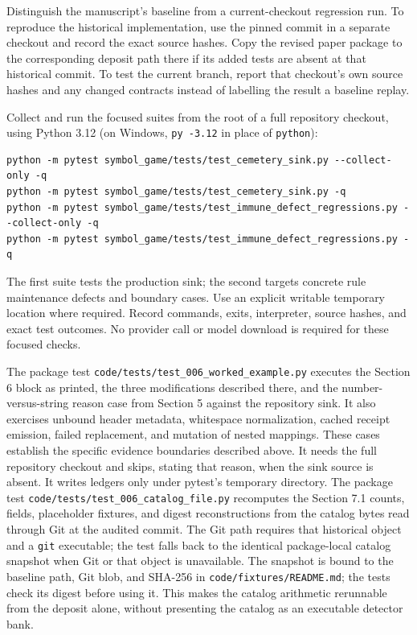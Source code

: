 \documentclass[
  11pt,
]{article}
\newcommand{\passthrough}[1]{#1}
\begin{document}
Distinguish the manuscript's baseline from a current-checkout regression
run. To reproduce the historical implementation, use the pinned commit
in a separate checkout and record the exact source hashes. Copy the
revised paper package to the corresponding deposit path there if its
added tests are absent at that historical commit. To test the current
branch, report that checkout's own source hashes and any changed
contracts instead of labelling the result a baseline replay.

Collect and run the focused suites from the root of a full repository
checkout, using Python 3.12 (on Windows,
\texttt{py -3.12} in place of
\passthrough{\lstinline!python!}):

\begin{lstlisting}
python -m pytest symbol_game/tests/test_cemetery_sink.py --collect-only -q
python -m pytest symbol_game/tests/test_cemetery_sink.py -q
python -m pytest symbol_game/tests/test_immune_defect_regressions.py --collect-only -q
python -m pytest symbol_game/tests/test_immune_defect_regressions.py -q
\end{lstlisting}

The first suite tests the production sink; the second targets concrete
rule maintenance defects and boundary cases. Use an explicit writable
temporary location where required. Record commands, exits, interpreter,
source hashes, and exact test outcomes. No provider call or model
download is required for these focused checks.

The package test
\texttt{\nolinkurl{code/tests/test_006_worked_example.py}}
executes the Section 6 block as printed, the three modifications
described there, and the number-versus-string reason case from Section 5
against the repository sink. It also exercises unbound header metadata,
whitespace normalization, cached receipt emission, failed replacement,
and mutation of nested mappings. These cases establish the specific
evidence boundaries described above. It needs the full repository
checkout and skips, stating that reason, when the sink source is absent.
It writes ledgers only under pytest's temporary directory. The package
test \texttt{\nolinkurl{code/tests/test_006_catalog_file.py}}
recomputes the Section 7.1 counts, fields, placeholder fixtures, and
digest reconstructions from the catalog bytes read through Git at the
audited commit. The Git path requires that historical object and a
\passthrough{\lstinline!git!} executable; the test falls back to the
identical package-local catalog snapshot when Git or that object is
unavailable. The snapshot is bound to the baseline path, Git blob, and
SHA-256 in \texttt{\nolinkurl{code/fixtures/README.md}}; the tests
check its digest before using it. This makes the catalog arithmetic
rerunnable from the deposit alone, without presenting the catalog as an
executable detector bank.
\end{document}
